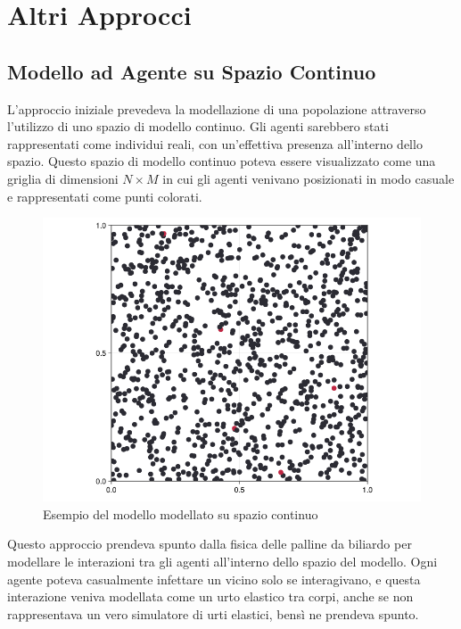 \section{Altri Approcci}

\subsection{Modello ad Agente su Spazio Continuo}

L'approccio iniziale prevedeva la modellazione di una popolazione 
attraverso l'utilizzo di uno spazio di modello continuo. 
Gli agenti sarebbero stati rappresentati come individui reali, 
con un'effettiva presenza all'interno dello spazio. Questo spazio 
di modello continuo poteva essere visualizzato come una griglia di 
dimensioni $N \times M$ in cui gli agenti venivano posizionati in 
modo casuale e rappresentati come punti colorati.

\begin{figure}[H]
	\begin{center}
		\includegraphics[width=\textwidth]{img/ball-covid.png}
        \caption{Esempio del modello modellato su spazio continuo}
		\label{fig:ball_covid}
    \end{center}
\end{figure}

Questo approccio prendeva spunto dalla fisica delle palline da 
biliardo per modellare le interazioni tra gli agenti all'interno 
dello spazio del modello. Ogni agente poteva casualmente infettare 
un vicino solo se interagivano, e questa interazione veniva modellata 
come un urto elastico tra corpi, anche se non rappresentava un vero 
simulatore di urti elastici, bensì ne prendeva spunto.

